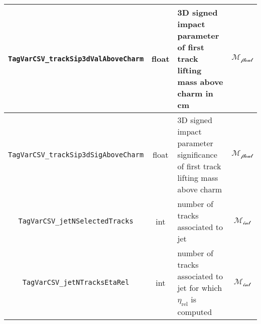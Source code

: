 \begin{table}[h]
\begin{tabularx}{\textwidth}{|c|c|X|c|}
\hline
\texttt{TagVarCSV\_trackSip3dValAboveCharm} & float & 3D signed impact parameter of first track lifting mass above charm in cm & \cellcolor{green!50}$\mathcal{M_{\text{float}}}$ \\
\hline
\texttt{TagVarCSV\_trackSip3dSigAboveCharm} & float & 3D signed impact parameter significance of first track lifting mass above charm & \cellcolor{green!50}$\mathcal{M_{\text{float}}}$ \\
\hline
\texttt{TagVarCSV\_jetNSelectedTracks} & int & number of tracks associated to jet & \cellcolor{orange!50}$\mathcal{M_{\text{int}}}$ \\
\hline
\texttt{TagVarCSV\_jetNTracksEtaRel} & int & number of tracks associated to jet for which \( \eta_{\text{rel}} \) is computed & \cellcolor{orange!50}$\mathcal{M_{\text{int}}}$ \\
\hline
\end{tabularx}
\label{tab:global_input_features}
\end{table}


